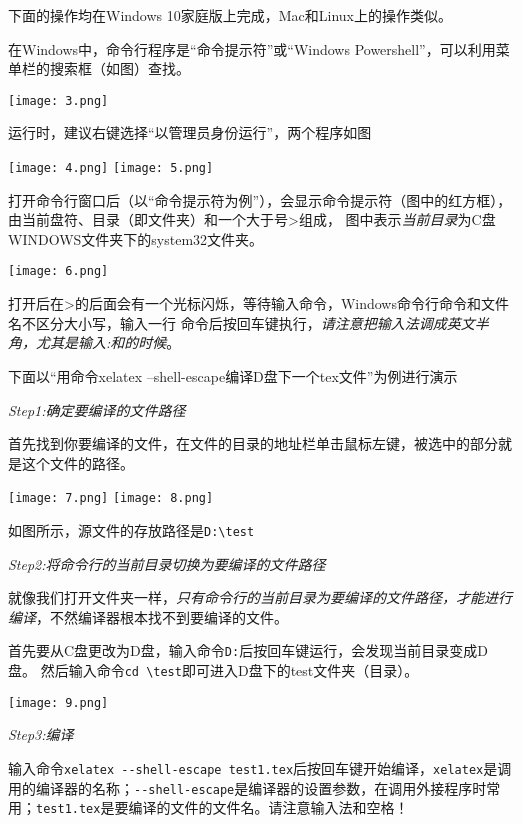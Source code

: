下面的操作均在Windows 10家庭版上完成，Mac和Linux上的操作类似。

在Windows中，命令行程序是“命令提示符”或“Windows Powershell”，可以利用菜单栏的搜索框（如图）查找。
\begin{center}
  \texttt{[image: 3.png]}
\end{center}运行时，建议右键选择“以管理员身份运行”，两个程序如图
\begin{center}
  \texttt{[image: 4.png]}
  \texttt{[image: 5.png]}
\end{center}

打开命令行窗口后（以“命令提示符为例”），会显示命令提示符（图中的红方框），由当前盘符、目录（即文件夹）和一个大于号>组成，
图中表示\emph{当前目录}为C盘WINDOWS文件夹下的system32文件夹。
\begin{center}
  \texttt{[image: 6.png]}
\end{center}
打开后在>的后面会有一个光标闪烁，等待输入命令，Windows命令行命令和文件名不区分大小写，输入一行
命令后按回车键执行，\emph{请注意把输入法调成英文半角，尤其是输入:和\texttt{}的时候}。

下面以“用命令xelatex --shell-escape编译D盘下一个tex文件”为例进行演示

\emph{Step1:确定要编译的文件路径}

  首先找到你要编译的文件，在文件的目录的地址栏单击鼠标左键，被选中的部分就是这个文件的路径。
\begin{center}
  \texttt{[image: 7.png]}
  \texttt{[image: 8.png]}
\end{center}
如图所示，源文件的存放路径是\verb"D:\test"

\emph{Step2:将命令行的当前目录切换为要编译的文件路径}

就像我们打开文件夹一样，\emph{只有命令行的当前目录为要编译的文件路径，才能进行编译}，不然编译器根本找不到要编译的文件。

首先要从C盘更改为D盘，输入命令\verb"D:"后按回车键运行，会发现当前目录变成D盘。
然后输入命令\verb"cd \test"即可进入D盘下的test文件夹（目录）。
\begin{center}
  \texttt{[image: 9.png]}
\end{center}

\emph{Step3:编译}

输入命令\verb"xelatex --shell-escape test1.tex"后按回车键开始编译，\verb"xelatex"是调用的编译器的名称；\verb"--shell-escape"是编译器的设置参数，在调用外接程序时常用；\verb"test1.tex"是要编译的文件的文件名。请注意输入法和空格！


